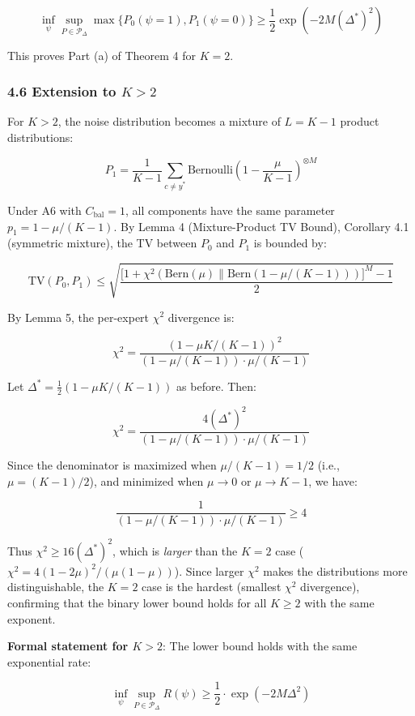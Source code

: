 \documentclass[
  12pt,
]{article}
\begin{document}
\[\inf_{\psi} \sup_{P \in \mathcal{P}_\Delta} \max\{P_0(\psi=1), P_1(\psi=0)\}
\geq \frac{1}{2}\exp(-2M(\Delta^*)^2)\]

This proves Part (a) of Theorem 4 for \(K=2\).

\subsubsection{\texorpdfstring{4.6 Extension to
\(K > 2\)}{4.6 Extension to K \textgreater{} 2}}\label{extension-to-k-2}

For \(K > 2\), the noise distribution becomes a mixture of \(L = K-1\)
product distributions:

\[P_1 = \frac{1}{K-1} \sum_{c \neq y^*} \text{Bernoulli}\!\left(1 - \frac{\mu}{K-1}\right)^{\otimes M}\]

Under A6 with \(C_{\text{bal}} = 1\), all components have the same
parameter \(p_1 = 1 - \mu/(K-1)\). By Lemma 4 (Mixture-Product TV
Bound), Corollary 4.1 (symmetric mixture), the TV between \(P_0\) and
\(P_1\) is bounded by:

\[\text{TV}(P_0, P_1) \leq \sqrt{ \frac{ \bigl[1 + \chi^2(\text{Bern}(\mu) \parallel \text{Bern}(1-\mu/(K-1)))\bigr]^M - 1 }{2} }\]

By Lemma 5, the per-expert \(\chi^2\) divergence is:

\[\chi^2 = \frac{(1 - \mu K/(K-1))^2}{(1 - \mu/(K-1)) \cdot \mu/(K-1)}\]

Let \(\Delta^* = \frac{1}{2}(1 - \mu K/(K-1))\) as before. Then:

\[\chi^2 = \frac{4(\Delta^*)^2}{(1 - \mu/(K-1)) \cdot \mu/(K-1)}\]

Since the denominator is maximized when \(\mu/(K-1) = 1/2\) (i.e.,
\(\mu = (K-1)/2\)), and minimized when \(\mu \to 0\) or \(\mu \to K-1\),
we have:

\[\frac{1}{(1 - \mu/(K-1)) \cdot \mu/(K-1)} \geq 4\]

Thus \(\chi^2 \geq 16(\Delta^*)^2\), which is \emph{larger} than the
\(K=2\) case (\(\chi^2 = 4(1-2\mu)^2/(\mu(1-\mu))\)). Since larger
\(\chi^2\) makes the distributions more distinguishable, the \(K=2\)
case is the hardest (smallest \(\chi^2\) divergence), confirming that
the binary lower bound holds for all \(K \geq 2\) with the same
exponent.

\textbf{Formal statement for \(K > 2\)}: The lower bound holds with the
same exponential rate:

\[\inf_{\psi} \sup_{P \in \mathcal{P}_\Delta} R(\psi) \geq \frac{1}{2} \cdot \exp(-2M\Delta^2)\]
\end{document}
